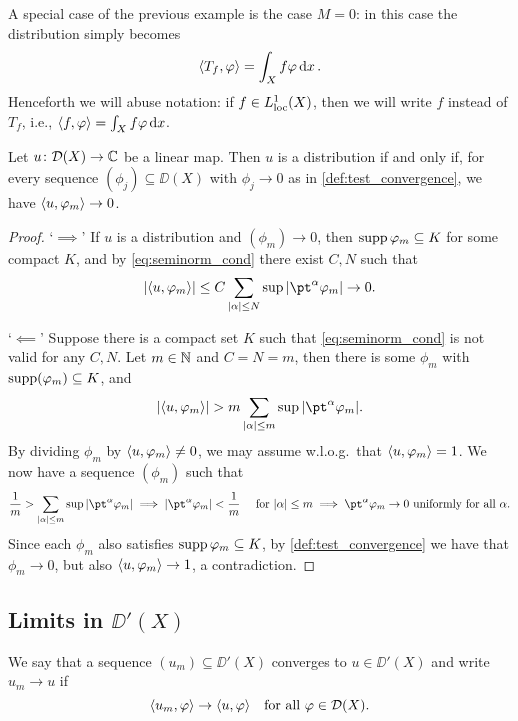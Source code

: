 A special case of the previous example is the case $M = 0$: in this case the distribution simply becomes
\[
\langle T_f, \varphi\rangle = \int_X f \varphi \dd{x}. 
\]
Henceforth we will abuse notation: if $f \in L^1_{\mathrm{loc}}(X)$, then we will write $f$ instead of $T_f$, i.e., $\langle f, \varphi\rangle = \int_X f\varphi \dd{x}$. 

\begin{lemma}
    Let $u \colon \mathcal D(X) \to \mathbb C$ be a linear map. Then $u$ is a distribution if and only if, for every sequence $(\phi_j) \subseteq \DD(X)$ with $\phi_j \to 0$ as in \cref{def:test_convergence}, we have $\langle u, \varphi_m\rangle \to 0$. 
\end{lemma}

\begin{proof}
    `$\implies$' If $u$ is a distribution and $(\phi_m) \to 0$, then $\operatorname{supp}\varphi_m \subseteq K$ for some compact $K$, and by \cref{eq:seminorm_cond} there exist $C, N$ such that
    \[
    \abs{\ang{u, \phi_m}} \leq C \sum_{\abs{\alpha} \leq N} \sup \abs{\pt^\alpha \phi_m} \to 0. 
    \]
    
    `$\impliedby$' Suppose there is a compact set $K$ such that \cref{eq:seminorm_cond} is not valid for any $C, N$. Let $m \in \mathbb N$ and $C = N = m$, then there is some $\phi_m$ with $\operatorname{supp}(\varphi_m) \subseteq K$, and 
    \[
    \abs{\ang{u, \phi_m}} > m \sum_{\abs{\alpha} \leq m} \sup \abs{\pt^\alpha \phi_m}. 
    \]
    By dividing $\phi_m$ by $\langle u, \varphi_m\rangle \neq 0$, we may assume w.l.o.g.\ that $\langle u, \varphi_m\rangle = 1$. 
    We now have a sequence $(\phi_m)$ such that
    \[
    \frac1m > \sum_{\abs{\alpha} \leq m} \sup \abs{\pt^\alpha \phi_m} \implies  \abs{\pt^\alpha \phi_m} < \frac1m \quad\text{ for $\abs{\alpha} \leq m$} \implies \pt^\alpha \phi_m \to 0 \text{ uniformly for all $\alpha$}. 
    \]
    Since each $\phi_m$ also satisfies $\operatorname{supp}\varphi_m\subseteq K$, by \cref{def:test_convergence} we have that $\phi_m \to 0$, but also $\langle u, \varphi_m\rangle \to 1$, a contradiction. 
\end{proof}

\subsection{Limits in $\DD'(X)$}
\begin{definition}
    We say that a sequence $(u_m) \subseteq \DD'(X)$ converges to $u \in \DD'(X)$ and write $u_m \to u$ if 
    \[
    \langle u_m, \varphi\rangle \to \langle u, \varphi\rangle \quad\text{for all $\varphi \in \mathcal D(X)$}. 
    \]
\end{definition}

